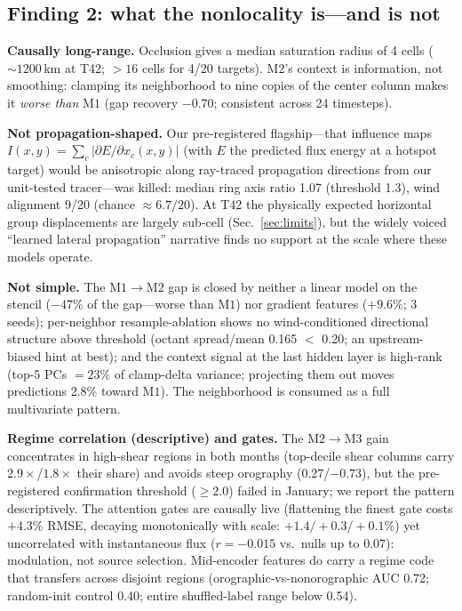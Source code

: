 \documentclass[10pt,twocolumn]{article}
\newcommand{\Mone}{\mathrm{M1}}
\newcommand{\Mtwo}{\mathrm{M2}}
\newcommand{\Mthree}{\mathrm{M3}}
\begin{document}
\subsection{Finding 2: what the nonlocality is---and is not}\label{sec:nonlocal}

\textbf{Causally long-range.} Occlusion gives a median saturation radius of 4 cells (${\sim}1200$\,km at T42; $>16$ cells for 4/20 targets). $\Mtwo$'s context is information, not smoothing: clamping its neighborhood to nine copies of the center column makes it \emph{worse than} $\Mone$ (gap recovery $-0.70$; consistent across 24 timesteps).

\textbf{Not propagation-shaped.} Our pre-registered flagship---that influence maps $I(x,y)=\sum_c |\partial E/\partial x_c(x,y)|$ (with $E$ the predicted flux energy at a hotspot target) would be anisotropic along ray-traced propagation directions from our unit-tested tracer---was killed: median ring axis ratio 1.07 (threshold 1.3), wind alignment 9/20 (chance ${\approx}6.7/20$). At T42 the physically expected horizontal group displacements are largely sub-cell (Sec.~\ref{sec:limits}), but the widely voiced ``learned lateral propagation'' narrative finds no support at the scale where these models operate.

\textbf{Not simple.} The $\Mone{\to}\Mtwo$ gap is closed by neither a linear model on the stencil ($-47\%$ of the gap---worse than $\Mone$) nor gradient features ($+9.6\%$; 3 seeds); per-neighbor resample-ablation shows no wind-conditioned directional structure above threshold (octant spread/mean 0.165 $<$ 0.20; an upstream-biased hint at best); and the context signal at the last hidden layer is high-rank (top-5 PCs $=23\%$ of clamp-delta variance; projecting them out moves predictions 2.8\% toward $\Mone$). The neighborhood is consumed as a full multivariate pattern.

\textbf{Regime correlation (descriptive) and gates.} The $\Mtwo{\to}\Mthree$ gain concentrates in high-shear regions in both months (top-decile shear columns carry $2.9\times$/$1.8\times$ their share) and avoids steep orography ($0.27$/$-0.73$), but the pre-registered confirmation threshold ($\ge 2.0$) failed in January; we report the pattern descriptively. The attention gates are causally live (flattening the finest gate costs $+4.3\%$ RMSE, decaying monotonically with scale: $+1.4/+0.3/+0.1\%$) yet uncorrelated with instantaneous flux ($r=-0.015$ vs.\ nulls up to $0.07$): modulation, not source selection. Mid-encoder features do carry a regime code that transfers across disjoint regions (orographic-vs-nonorographic AUC 0.72; random-init control 0.40; entire shuffled-label range below 0.54).
\end{document}
